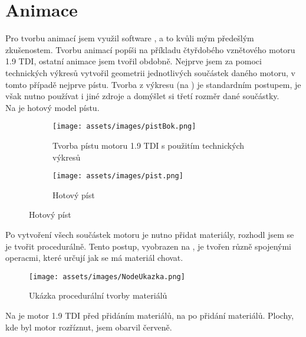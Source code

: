 \section{Animace}\label{sc:animace}
{Pro tvorbu animací jsem využil software , a to kvůli mým předešlým zkušenostem. Tvorbu animací popíši na příkladu čtyřdobého vznětového motoru 1.9 TDI, ostatní animace jsem tvořil obdobně.}\odst
{Nejprve jsem za pomoci technických výkresů vytvořil geometrii jednotlivých součástek daného motoru, v tomto případě nejprve pístu. Tvorba z výkresu (na ) je standardním postupem, je však nutno používat i jiné zdroje a domýšlet si třetí rozměr dané součástky.\\ Na  je hotový model pístu.}

\begin{figure}[H]
    \centering
    \begingroup
    \makeatletter
    \renewcommand\thesubfigure{\thefigure~--~\@nameuse{subfiglabel@\alph{subfigure}}}
    \newcommand{\subfiglabel@a}{vlevo}
    \newcommand{\subfiglabel@b}{vpravo}
    \captionsetup[subfigure]{labelformat=simple, labelsep=colon}
    \renewcommand\p@subfigure{}
    \makeatother
    \begin{subfigure}{.5\textwidth}
        \centering
        \texttt{[image: assets/images/pistBok.png]}
        \caption{Tvorba pístu motoru 1.9 TDI s použitím technických výkresů \jaObr}
        \label{obr:pistVykresy}
    \end{subfigure}%
    \begin{subfigure}{.5\textwidth}
        \centering
        \texttt{[image: assets/images/pist.png]}
        \caption{Hotový píst \jaObr}
        \label{obr:pistHotovy}
    \end{subfigure}
    \endgroup
\end{figure}

{Po vytvoření všech součástek motoru je nutno přidat materiály, rozhodl jsem se je tvořit procedurálně. Tento postup, vyobrazen na , je tvořen různě spojenými operacmi, které určují jak se má materiál chovat.}

\begin{figure}[H]
    \centering
    \texttt{[image: assets/images/NodeUkazka.png]}
    \caption{Ukázka procedurální tvorby materiálů \jaObr}
    \label{obr:NodeUkazka}
\end{figure}

\newpage

{Na  je motor 1.9 TDI před přidáním materiálů, na  po přidání materiálů. Plochy, kde byl motor rozříznut, jsem obarvil červeně.}

